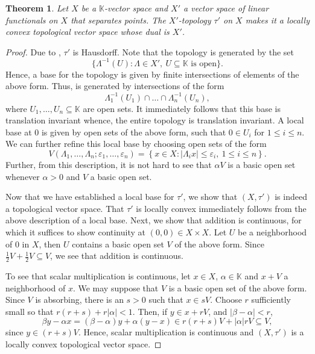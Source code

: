 \documentclass[11pt]{article}
\theoremstyle{thmstyle}
\newtheorem{theorem}{Theorem}[section]
\theoremstyle{defstyle}
\newcommand{\R}{\mathbb{R}}
\newcommand{\bbC}{\mathbb{C}}
\newcommand{\K}{\mathbb{K}} %
\renewcommand{\le}{\leqslant}
\begin{document}
\begin{theorem}
    Let $X$ be a $\K$-vector space and $X'$ a vector space of linear functionals on $X$ that separates points. The $X'$-topology $\tau'$ on $X$ makes it a locally convex topological vector space whose dual is $X'$.
\end{theorem}
\begin{proof}
    Due to , $\tau'$ is Hausdorff. Note that the topology is generated by the set 
    \begin{equation*}
        \{\Lambda^{-1}(U)\colon\Lambda\in X',~U\subseteq\K\text{ is open}\}.
    \end{equation*}
    Hence, a base for the topology is given by finite intersections of elements of the above form. Thus, is generated by intersections of the form 
    \begin{equation*}
        \Lambda_1^{-1}(U_1)\cap\dots\cap\Lambda_n^{-1}(U_n),
    \end{equation*}
    where $U_1,\dots,U_n\subseteq\K$ are open sets. It immediately follows that this base is translation invariant whence, the entire topology is translation invariant. A local base at $0$ is given by open sets of the above form, such that $0\in U_i$ for $1\le i\le n$. We can further refine this local base by choosing open sets of the form 
    \begin{equation*}
        V(\Lambda_1,\dots,\Lambda_n; \varepsilon_1,\dots,\varepsilon_n) = \left\{x\in X\colon|\Lambda_i x|\le \varepsilon_i,~1\le i\le n\right\}.
    \end{equation*}
    Further, from this description, it is not hard to see that $\alpha V$ is a basic open set whenever $\alpha > 0$ and $V$ a basic open set.

    Now that we have established a local base for $\tau'$, we show that $(X, \tau')$ is indeed a topological vector space. That $\tau'$ is locally convex immediately follows from the above description of a local base. Next, we show that addition is continuous, for which it suffices to show continuity at $(0, 0)\in X\times X$. Let $U$ be a neighborhood of $0$ in $X$, then $U$ contains a basic open set $V$ of the above form. Since $\frac{1}{2}V + \frac{1}{2}V\subseteq V$, we see that addition is continuous.

    To see that scalar multiplication is continuous, let $x\in X$, $\alpha\in\K$ and $x + V$ a neighborhood of $x$. We may suppose that $V$ is a basic open set of the above form. Since $V$ is absorbing, there is an $s > 0$ such that $x\in sV$. Choose $r$ sufficiently small so that $r(r + s) + r|\alpha| < 1$. Then, if $y\in x + rV$, and $|\beta - \alpha| < r$,
    \begin{equation*}
        \beta y - \alpha x = (\beta - \alpha)y + \alpha(y - x)\in r(r + s)V + |\alpha|rV\subseteq V,
    \end{equation*}
    since $y\in (r + s)V$. Hence, scalar multiplication is continuous and $(X, \tau')$ is a locally convex topological vector space. 


\end{proof}
\end{document}
